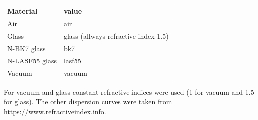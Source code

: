 \documentclass[a4paper,html,11pt,openany]{book}
\begin{document}
 \vspace{1em}
 \begin{center}
 \begin{tabular}[H]{l|l}
 Material & value \\
 \hline 
 Air & air \\
 Glass & glass (allways refractive index 1.5) \\
 N-BK7 glass & bk7 \\
 N-LASF55 glass & lasf55 \\
 Vacuum & vacuum \\ 
 \end{tabular}
 \end{center}
 For vacuum and glass constant refractive indices were used (1 for vacuum and 1.5 for glass). The other dispersion curves were taken from \url{https://www.refractiveindex.info}. 
\end{document}
